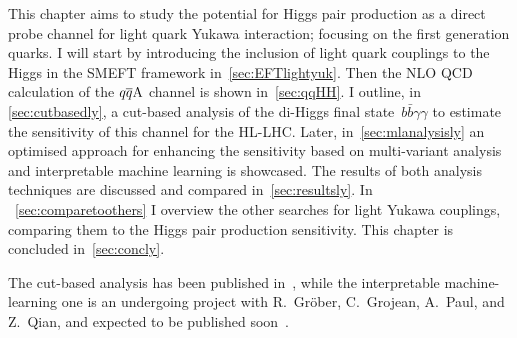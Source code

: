 \par This chapter aims to study the potential for Higgs pair production as a direct probe channel for light quark Yukawa interaction; focusing on the first generation quarks.  I will start by introducing the inclusion of light quark couplings to the Higgs in the SMEFT framework in~\autoref{sec:EFTlightyuk}. Then the NLO QCD calculation of the $q\overline q \rm A$ channel is shown in~\autoref{sec:qqHH}. I outline, in \autoref{sec:cutbasedly},  a cut-based analysis of the di-Higgs final state~$ b \bar b \gamma \gamma$ to estimate the sensitivity of this channel for the HL-LHC. Later, in~\autoref{sec:mlanalysisly} an optimised approach for enhancing the sensitivity based on multi-variant analysis and interpretable machine learning is showcased. The results of both analysis techniques are discussed and compared in~\autoref{sec:resultsly}. In ~\autoref{sec:comparetoothers} I overview the other searches for light Yukawa couplings, comparing them to the Higgs pair production sensitivity. This chapter is concluded in~\autoref{sec:concly}. \par  The cut-based analysis has been published in~\cite{Alasfar:2019pmn}, while the interpretable machine-learning one is an undergoing project with R.~Gr\"ober, C.~Grojean, A.~Paul, and Z.~Qian, and expected to be published soon~\cite{IML}. 
